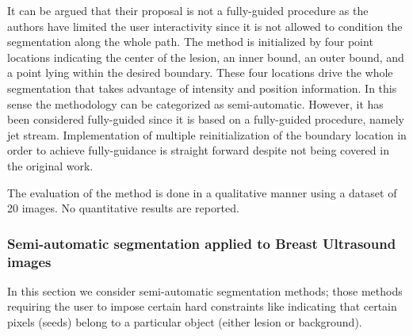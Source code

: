 \documentclass[authoryear,preprint,review,12pt]{elsarticle}
\begin{document}
It can be argued that their proposal is not a fully-guided procedure as the authors have limited the user interactivity since it is not allowed to condition the segmentation along the whole path. The method is initialized by four point locations indicating the center of the lesion, an inner bound, an outer bound, and a point lying within the desired boundary. These four locations drive the whole segmentation that takes advantage of intensity and position information. In this sense the methodology can be categorized as semi-automatic. However, it has been considered fully-guided since it is based on a fully-guided procedure, namely jet stream. Implementation of multiple reinitialization of the boundary location in order to achieve fully-guidance is straight forward despite not being covered in the original work. 

The evaluation of the method is done in a qualitative manner using a dataset of 20 images. No quantitative results are reported. 



\subsubsection{Semi-automatic segmentation applied to Breast Ultrasound images}\label{sec:semi-auto}
In this section we consider semi-automatic segmentation methods; those methods requiring the user to impose certain hard constraints like indicating that certain pixels (seeds) belong to a particular object (either lesion or background).
\end{document}
